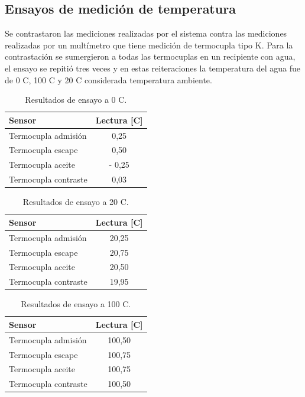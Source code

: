 \subsection{Ensayos de medición de temperatura}

Se contrastaron las mediciones realizadas por el sistema contra las mediciones realizadas por un multímetro que tiene medición de termocupla tipo K. Para la contrastación se sumergieron a todas las termocuplas en un recipiente con agua, el ensayo se repitió tres veces y en estas reiteraciones la temperatura del agua fue de 0 \degree C, 100 \degree C y 20 \degree C considerada temperatura ambiente.

\begin{table}[htpb]
	\centering
	\caption{Resultados de ensayo a 0 \degree C.}
	\centering
	\begin{tabular}{l c}    
		\toprule
		\textbf{Sensor }     & \textbf{Lectura [\degree C]} \\
		\midrule
		Termocupla admisión		&   0,25 \\
		Termocupla escape		&   0,50 \\
		Termocupla aceite		& - 0,25 \\
		Termocupla contraste	&   0,03 \\
		\bottomrule
	\end{tabular}
	\label{tab:ensayo-0-degree}
\end{table}

\begin{table}[htpb]
	\centering
	\caption{Resultados de ensayo a 20 \degree C.}
	\centering
	\begin{tabular}{l c}    
		\toprule
		\textbf{Sensor }     & \textbf{Lectura [\degree C]} \\
		\midrule
		Termocupla admisión		&   20,25 \\
		Termocupla escape		&   20,75 \\
		Termocupla aceite		&   20,50 \\
		Termocupla contraste	&   19,95 \\
		\bottomrule
	\end{tabular}
	\label{tab:ensayo-20-degree}
\end{table}

\begin{table}[htpb]
	\centering
	\caption{Resultados de ensayo a 100 \degree C.}
	\centering
	\begin{tabular}{l c}    
		\toprule
		\textbf{Sensor }     & \textbf{Lectura [\degree C]} \\
		\midrule
		Termocupla admisión		&   100,50 \\
		Termocupla escape		&   100,75 \\
		Termocupla aceite		&   100,75 \\
		Termocupla contraste	&   100,50 \\
		\bottomrule
	\end{tabular}
	\label{tab:ensayo-100-degree}
\end{table}

